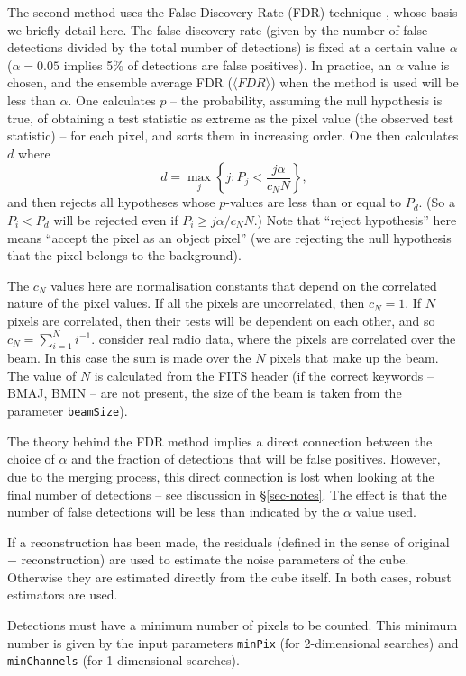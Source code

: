 The second method uses the False Discovery Rate (FDR) technique
\citep{miller01,hopkins02}, whose basis we briefly detail here. The
false discovery rate (given by the number of false detections divided
by the total number of detections) is fixed at a certain value
$\alpha$ (\eg $\alpha=0.05$ implies 5\% of detections are false
positives). In practice, an $\alpha$ value is chosen, and the ensemble
average FDR (\ie $\langle FDR \rangle$) when the method is used will
be less than $\alpha$.  One calculates $p$ -- the probability,
assuming the null hypothesis is true, of obtaining a test statistic as
extreme as the pixel value (the observed test statistic) -- for each
pixel, and sorts them in increasing order. One then calculates $d$
where
\[
d = \max_j \left\{ j : P_j < \frac{j\alpha}{c_N N} \right\},
\]
and then rejects all hypotheses whose $p$-values are less than or
equal to $P_d$. (So a $P_i<P_d$ will be rejected even if $P_i \geq
j\alpha/c_N N$.) Note that ``reject hypothesis'' here means ``accept
the pixel as an object pixel'' (\ie we are rejecting the null
hypothesis that the pixel belongs to the background).

The $c_N$ values here are normalisation constants that depend on the
correlated nature of the pixel values. If all the pixels are
uncorrelated, then $c_N=1$. If $N$ pixels are correlated, then their
tests will be dependent on each other, and so $c_N = \sum_{i=1}^N
i^{-1}$. \citet{hopkins02} consider real radio data, where the pixels
are correlated over the beam. In this case the sum is made over the
$N$ pixels that make up the beam. The value of $N$ is calculated from
the FITS header (if the correct keywords -- BMAJ, BMIN -- are not
present, the size of the beam is taken from the parameter
\texttt{beamSize}). 

The theory behind the FDR method implies a direct connection between
the choice of $\alpha$ and the fraction of detections that will be
false positives. However, due to the merging process, this direct
connection is lost when looking at the final number of detections --
see discussion in \S\ref{sec-notes}. The effect is that the number of
false detections will be less than indicated by the $\alpha$ value
used.

If a reconstruction has been made, the residuals (defined in the sense
of original $-$ reconstruction) are used to estimate the noise
parameters of the cube. Otherwise they are estimated directly from the
cube itself. In both cases, robust estimators are used.

Detections must have a minimum number of pixels to be counted. This
minimum number is given by the input parameters \texttt{minPix} (for
2-dimensional searches) and \texttt{minChannels} (for 1-dimensional
searches).


